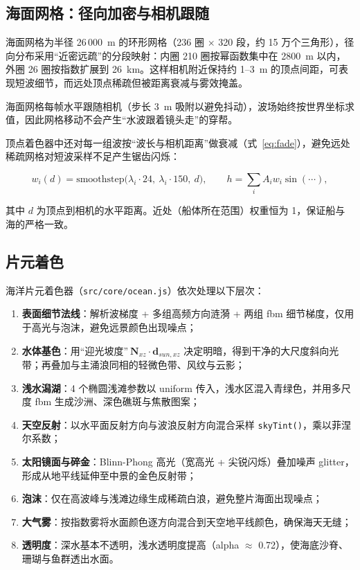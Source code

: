 \documentclass[UTF8, a4paper, 11pt]{ctexart}
\newcommand{\file}[1]{\texttt{#1}}
\begin{document}
\subsection{海面网格：径向加密与相机跟随}

海面网格为半径 26\,000~m 的环形网格（236 圈 $\times$ 320 段，约 15 万个三角形），径向分布采用“近密远疏”的分段映射：内圈 210 圈按幂函数集中在 2800~m 以内，外圈 26 圈按指数扩展到 26~km。这样相机附近保持约 1--3~m 的顶点间距，可表现短波细节，而远处顶点稀疏但被距离衰减与雾效掩盖。

海面网格每帧水平跟随相机（步长 3~m 吸附以避免抖动），波场始终按世界坐标求值，因此网格移动不会产生“水波跟着镜头走”的穿帮。

顶点着色器中还对每一组波按“波长与相机距离”做衰减（式~\ref{eq:fade}），避免远处稀疏网格对短波采样不足产生锯齿闪烁：

\begin{equation}
w_i(d)=\mathrm{smoothstep}\big(\lambda_i\!\cdot\!24,\ \lambda_i\!\cdot\!150,\ d\big),\qquad
h=\sum_i A_i w_i \sin(\cdots),
\label{eq:fade}
\end{equation}

其中 $d$ 为顶点到相机的水平距离。近处（船体所在范围）权重恒为 1，保证船与海的严格一致。

\subsection{片元着色}

海洋片元着色器（\file{src/core/ocean.js}）依次处理以下层次：

\begin{enumerate}
  \item \textbf{表面细节法线}：解析波梯度 + 多组高频方向涟漪 + 两组 fbm 细节梯度，仅用于高光与泡沫，避免远景颜色出现噪点；
  \item \textbf{水体基色}：用“迎光坡度”$\ \mathbf{N}_{xz}\cdot\mathbf{d}_{sun,xz}$ 决定明暗，得到干净的大尺度斜向光带；再叠加与主涌浪同相的轻微色带、风纹与云影；
  \item \textbf{浅水潟湖}：4 个椭圆浅滩参数以 uniform 传入，浅水区混入青绿色，并用多尺度 fbm 生成沙洲、深色礁斑与焦散图案；
  \item \textbf{天空反射}：以水平面反射方向与波浪反射方向混合采样 \texttt{skyTint()}，乘以菲涅尔系数；
  \item \textbf{太阳镜面与碎金}：Blinn-Phong 高光（宽高光 + 尖锐闪烁）叠加噪声 glitter，形成从地平线延伸至中景的金色反射带；
  \item \textbf{泡沫}：仅在高波峰与浅滩边缘生成稀疏白浪，避免整片海面出现噪点；
  \item \textbf{大气雾}：按指数雾将水面颜色逐方向混合到天空地平线颜色，确保海天无缝；
  \item \textbf{透明度}：深水基本不透明，浅水透明度提高（alpha $\approx$ 0.72），使海底沙脊、珊瑚与鱼群透出水面。
\end{enumerate}
\end{document}
